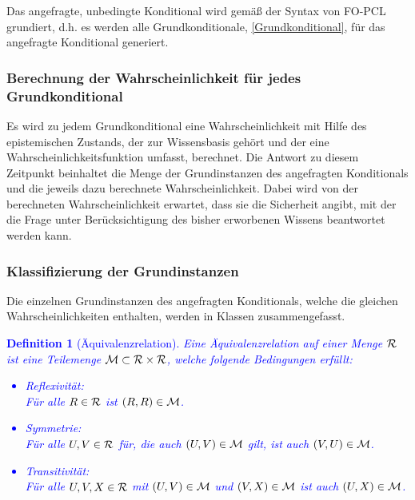 \documentclass[a4paper, 11pt]{book}
\newtheorem{Def}{Definition }[section]
\begin{document}
Das angefragte, unbedingte Konditional wird gemäß der Syntax von FO-PCL grundiert, d.h. es werden alle Grundkonditionale, \ref{Grundkonditional},  für das angefragte Konditional generiert.

\subsubsection{Berechnung der Wahrscheinlichkeit für jedes Grundkonditional}
Es wird zu jedem Grundkonditional eine Wahrscheinlichkeit mit Hilfe des epistemischen Zustands, der zur Wissensbasis gehört und der eine Wahrscheinlichkeitsfunktion umfasst, berechnet. Die Antwort zu diesem Zeitpunkt beinhaltet die Menge der Grundinstanzen des angefragten Konditionals und die jeweils dazu berechnete Wahrscheinlichkeit. Dabei wird von der berechneten Wahrscheinlichkeit erwartet, dass sie die Sicherheit angibt, mit der die Frage unter Berücksichtigung des bisher erworbenen Wissens beantwortet werden kann.
	
\subsubsection{Klassifizierung der Grundinstanzen} 
Die einzelnen Grundinstanzen des angefragten Konditionals, welche die gleichen Wahrscheinlichkeiten enthalten, werden in Klassen zusammengefasst.
\textcolor{blue}{
\begin{Def}[Äquivalenzrelation] \label{Äquivalenzrelation}
Eine Äquivalenzrelation auf einer Menge $ \cal{R} $  ist eine Teilemenge $ \cal{M} \subset \cal{R} \times \cal{R}$, welche folgende Bedingungen erfüllt:\\
\begin{itemize}
	\item Reflexivität:\\
	 Für alle $ R \in \cal{R} $ ist $ (R,R) \in \cal{M} $.
	\item Symmetrie: \\
	Für alle $ U,V \in \cal{R} $ für, die auch  $ (U,V) \in \cal{M} $ gilt, ist auch  $ (V,U) \in \cal{M} $.
	\item  Transitivität:\\
	Für alle $ U,V,X  \in \cal{R} $ mit $ (U,V) \in \cal{M} $ und $ (V,X) \in \cal{M} $ ist auch $ (U,X) \in \cal{M} $.
\end{itemize}
\end{Def}
}
\end{document}
